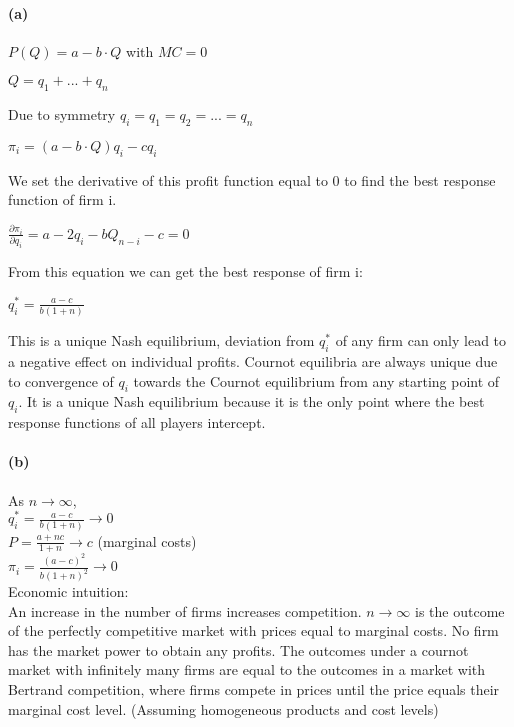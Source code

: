 \documentclass[]{article}
\let\oldparagraph\paragraph
\renewcommand{\paragraph}[1]{\oldparagraph{#1}\mbox{}}
\begin{document}
\paragraph{(a)}\label{a}

$P(Q)=a-b\cdot Q$ with $MC=0$

$Q=q_1+...+q_n$ 

Due to symmetry $q_i=q_1=q_2=...=q_n$

$\pi_i=(a-b\cdot Q)q_i-cq_i$

We set the derivative of this profit function equal to 0 to find the best response function of firm i.

$\frac{\partial\pi_i}{\partial q_i}=a-2q_i-bQ_{n-i}-c=0$

From this equation we can get the best response of firm i:

$q_i^*=\frac{a-c}{b(1+n)}$

This is a unique Nash equilibrium, deviation from $q_i^*$ of any firm can only lead to a negative effect on individual profits. Cournot equilibria are always unique due to convergence of $q_i$ towards the Cournot equilibrium from any starting point of $q_i$. It is a unique Nash equilibrium because it is the only point where the best response functions of all players intercept.

\paragraph{(b)}

As $n\rightarrow\infty$, \\
$q_i^*=\frac{a-c}{b(1+n)}\rightarrow 0$\\
$P=\frac{a+nc}{1+n}\rightarrow c$    (marginal costs)\\
$\pi_i=\frac{(a-c)^2}{b(1+n)^2}\rightarrow 0$ \\

Economic intuition:\\
An increase in the number of firms increases competition. $n\rightarrow\infty$ is the outcome of the perfectly competitive market with prices equal to marginal costs. No firm has the market power to obtain any profits. 
The outcomes under a cournot market with infinitely many firms are equal to the outcomes in a market with Bertrand competition, where firms compete in prices until the price equals their marginal cost level. (Assuming homogeneous products and cost levels) 
\end{document}
